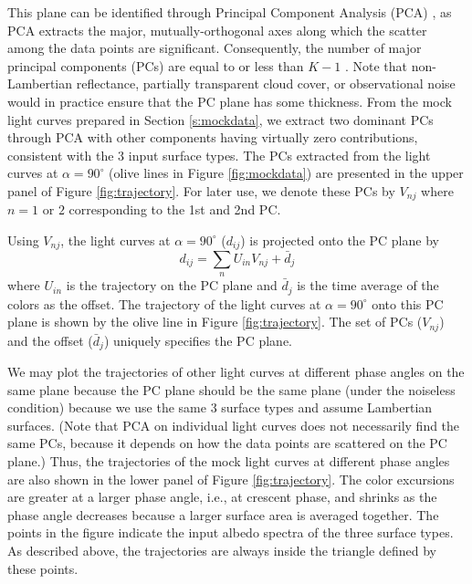 \documentclass[iop,numberedappendix,apj,]{emulateapj}
\begin{document}
This plane can be identified through Principal Component Analysis (PCA) \citep{Cowan2009,Cowan2011}, as PCA extracts the major, mutually-orthogonal axes along which the scatter among the data points are significant. 
Consequently, the number of major principal components (PCs) are equal to or less than $K-1$ \citep{Cowan2011}. 
{\color{red} Note that non-Lambertian reflectance, partially transparent cloud cover, or observational noise would in practice ensure that the PC plane has some thickness. }
From the mock light curves prepared in Section \ref{s:mockdata}, we extract two dominant PCs through PCA with other components having virtually zero contributions, consistent with the 3 input surface types.  
The PCs extracted from the light curves at $\alpha = 90^{\circ }$ (olive lines in Figure \ref{fig:mockdata}) are presented in the upper panel of Figure \ref{fig:trajectory}. 
For later use, we denote these PCs by $V_{nj}$ where $n=1$ or $2$  corresponding to the 1st and 2nd PC. 

Using $V_{nj}$, the light curves at $\alpha = 90^{\circ }$ ($d_{ij}$) is projected onto the PC plane by
\begin{equation}
d_{ij} = \sum_n U_{in} V_{nj} + \bar d_j
\end{equation}
where $U_{in}$ is the trajectory on the PC plane and $\bar d_j$ is the time average of the colors as the offset. 
The trajectory of the light curves at $\alpha = 90^{\circ }$ onto this PC plane is shown by the olive line in Figure \ref{fig:trajectory}. 
The set of PCs ($V_{nj}$) and the offset ($\bar d_j$) uniquely specifies the PC plane. 

We may plot the trajectories of other light curves at different phase angles on the same plane because the PC plane should be the same plane (under the noiseless condition) because we use the same 3 surface types and assume Lambertian surfaces. 
(Note that PCA on individual light curves does not necessarily find the same PCs, because it depends on how the data points are scattered on the PC plane.)
Thus, the trajectories of the mock light curves at different phase angles are also shown in the lower panel of Figure \ref{fig:trajectory}. 
The color excursions are greater at a larger phase angle, i.e., at crescent phase, and shrinks as the phase angle decreases because a larger surface area is averaged together.  
The points in the figure indicate the input albedo spectra of the three surface types. 
As described above, the trajectories are always inside the triangle defined by these points. 
\end{document}
